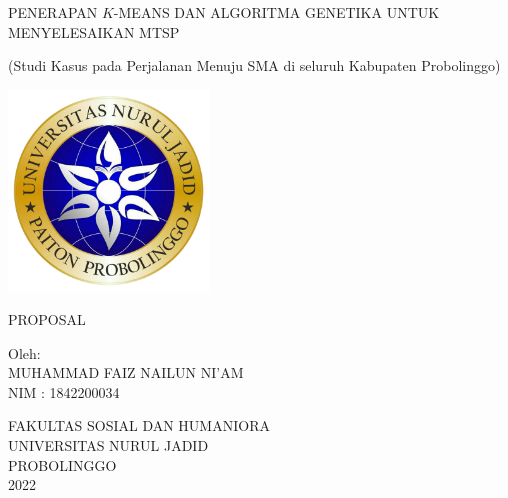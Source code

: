 \begin{titlepage}
   \begin{center}

       PENERAPAN $K$-MEANS DAN ALGORITMA GENETIKA UNTUK MENYELESAIKAN MTSP
       
       (Studi Kasus pada Perjalanan Menuju SMA di seluruh Kabupaten Probolinggo)

       \vfill
       
       \includegraphics[width=0.4\textwidth]{logo.png}
       
       \vfill
       
       PROPOSAL
       
       \vfill
       
       Oleh:\\
       MUHAMMAD FAIZ NAILUN NI'AM\\
       NIM : 1842200034

       \vfill
       
       FAKULTAS SOSIAL DAN HUMANIORA\\       
       UNIVERSITAS NURUL JADID\\
       PROBOLINGGO\\
       2022
       
   \end{center}
\end{titlepage}